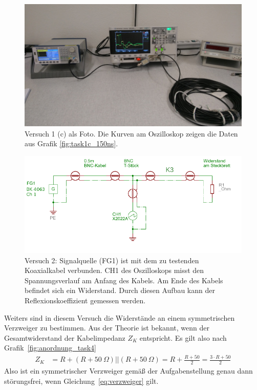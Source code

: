 \documentclass{article}
\begin{document}
\begin{figure}[H]
\centering
\caption{Versuch 1 (c) als Foto. Die Kurven am Oszilloskop zeigen die Daten aus Grafik \ref{fig:task1c_150ns}.}
\label{fig:foto_task1c}
\includegraphics[scale=0.6]{foto_task1c.jpg}
\end{figure}


\begin{figure}[H]
\centering
\caption{Versuch 2: Signalquelle (FG1) ist mit dem zu testenden Koaxialkabel verbunden. CH1 des Oszilloskops misst den Spannungsverlauf am Anfang des Kabels. Am Ende des Kabels befindet sich ein Widerstand. Durch diesen Aufbau kann der Reflexionskoeffizient gemessen werden.}
\label{fig:anordnung_task2}
\includegraphics[scale=2]{task2.png}
\end{figure}


Weiters sind in diesem Versuch die Widerstände an einem symmetrischen Verzweiger zu bestimmen. Aus der Theorie ist bekannt, wenn der Gesamtwiderstand der Kabelimpedanz $Z_K$ entspricht. Es gilt also nach Grafik~\ref{fig:anordnung_task4}
\begin{align}
\label{eq:verzweiger}
Z_K &= R + (R+50~\Omega)||(R+50~\Omega) = R + \frac{R+50}{2} = \frac{3\cdot R + 50}{2}
\end{align}
Also ist ein symmetrischer Verzweiger gemäß der Aufgabenstellung genau dann störungsfrei, wenn Gleichung~\eqref{eq:verzweiger} gilt.
\end{document}
